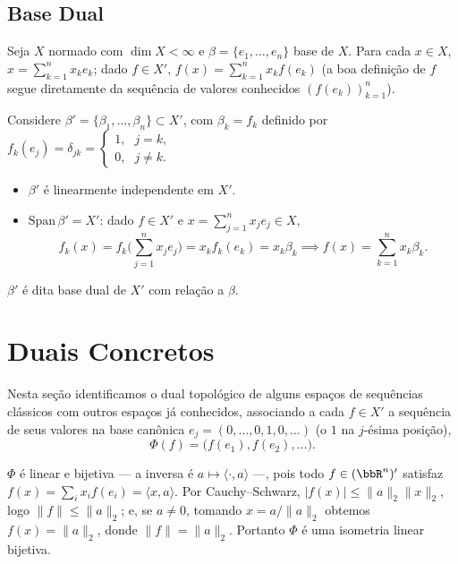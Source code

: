 
\subsection*{Base Dual}

Seja $X$ normado com $\dim X<\infty$ e $\beta=\{e_1,\dots,e_n\}$ base de $X$. Para cada $x\in X$,
$x=\sum_{k=1}^{n}x_ke_k$; dado $f\in X'$, $f(x)=\sum_{k=1}^{n}x_kf(e_k)$ (a boa definição de $f$ segue
diretamente da sequência de valores conhecidos $(f(e_k))_{k=1}^{n}$).

Considere $\beta'=\{\beta_1,\dots,\beta_n\}\subset X'$, com $\beta_k=f_k$ definido por
$f_k(e_j)=\delta_{jk}=\begin{cases}1\text{,}&j=k\text{,}\\0\text{,}&j\neq k\text{.}\end{cases}$

\begin{itemize}
	\item $\beta'$ é linearmente independente em $X'$.
	\item $\text{Span}\,\beta'=X'$: dado $f\in X'$ e $x=\sum_{j=1}^{n}x_je_j\in X$,
	      $$f_k(x)=f_k\Big(\sum_{j=1}^{n}x_je_j\Big)=x_kf_k(e_k)=x_k\beta_k \implies
	      f(x)=\sum_{k=1}^{n}x_k\beta_k\text{.}$$
\end{itemize}

$\beta'$ é dita base dual de $X'$ com relação a $\beta$.

\section{Duais Concretos}

Nesta seção identificamos o dual topológico de alguns espaços de sequências clássicos com outros espaços
já conhecidos, associando a cada $f\in X'$ a sequência de seus valores na base canônica
$e_j=(0,\dots,0,1,0,\dots)$ (o $1$ na $j$-ésima posição),
$$\Phi(f)=\big(f(e_1),f(e_2),\dots\big)\text{.}$$

\begin{myproof}
	$\Phi$ é linear e bijetiva — a inversa é $a\mapsto\langle\cdot,a\rangle$ —, pois todo $f\in(\bbR^n)'$
	satisfaz $f(x)=\sum_i x_if(e_i)=\langle x,a\rangle$. Por Cauchy--Schwarz, $|f(x)|\leq\|a\|_2\|x\|_2$,
	logo $\|f\|\leq\|a\|_2$; e, se $a\neq0$, tomando $x=a/\|a\|_2$ obtemos $f(x)=\|a\|_2$, donde
	$\|f\|=\|a\|_2$. Portanto $\Phi$ é uma isometria linear bijetiva.
\end{myproof}

